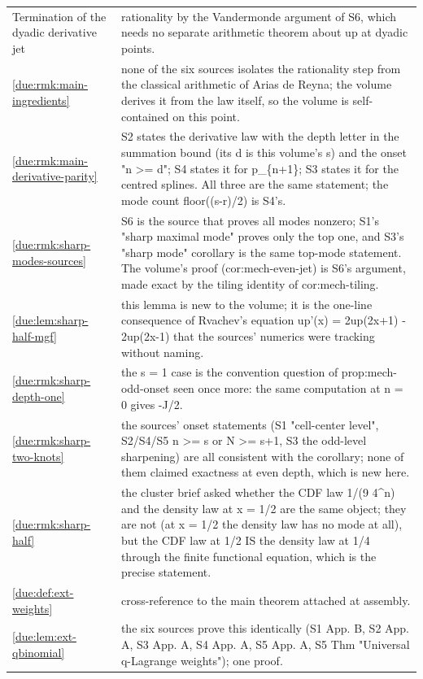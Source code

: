 \documentclass[11pt,oneside]{article}
\theoremstyle{plain}
\theoremstyle{definition}
\theoremstyle{remark}
\begin{document}
\begin{longtable}{@{}p{} p{}@{}}
Termination of the dyadic derivative jet & rationality by the Vandermonde argument of S6, which needs no separate arithmetic theorem about up at dyadic points.\\
\cref{due:rmk:main-ingredients} & none of the six sources isolates the rationality step from the classical arithmetic of Arias de Reyna; the volume derives it from the law itself, so the volume is self-contained on this point.\\
\cref{due:rmk:main-derivative-parity} & S2 states the derivative law with the depth letter in the summation bound (its d is this volume's s) and the onset "n >= d"; S4 states it for p\_\{n+1\}; S3 states it for the centred splines. All three are the same statement; the mode count floor((s-r)/2) is S4's.\\
\cref{due:rmk:sharp-modes-sources} & S6 is the source that proves all modes nonzero; S1's "sharp maximal mode" proves only the top one, and S3's "sharp mode" corollary is the same top-mode statement. The volume's proof (cor:mech-even-jet) is S6's argument, made exact by the tiling identity of cor:mech-tiling.\\
\cref{due:lem:sharp-half-mgf} & this lemma is new to the volume; it is the one-line consequence of Rvachev's equation up'(x) = 2up(2x+1) - 2up(2x-1) that the sources' numerics were tracking without naming.\\
\cref{due:rmk:sharp-depth-one} & the s = 1 case is the convention question of prop:mech-odd-onset seen once more: the same computation at n = 0 gives -J/2.\\
\cref{due:rmk:sharp-two-knots} & the sources' onset statements (S1 "cell-center level", S2/S4/S5 n >= s or N >= s+1, S3 the odd-level sharpening) are all consistent with the corollary; none of them claimed exactness at even depth, which is new here.\\
\cref{due:rmk:sharp-half} & the cluster brief asked whether the CDF law 1/(9 4\textasciicircum n) and the density law at x = 1/2 are the same object; they are not (at x = 1/2 the density law has no mode at all), but the CDF law at 1/2 IS the density law at 1/4 through the finite functional equation, which is the precise statement.\\
\cref{due:def:ext-weights} & cross-reference to the main theorem attached at assembly.\\
\cref{due:lem:ext-qbinomial} & the six sources prove this identically (S1 App. B, S2 App. A, S3 App. A, S4 App. A, S5 App. A, S5 Thm "Universal q-Lagrange weights"); one proof.\\

\end{longtable}
\end{document}
